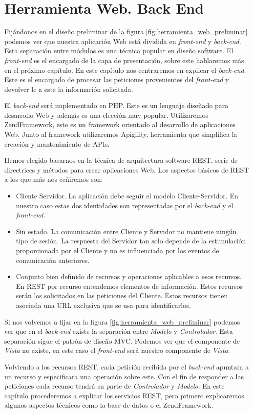 \chapter{Herramienta Web. Back End}
\label{backend}

Fijándonos en el diseño preliminar de la figura \ref{fig:herramienta_web_preliminar} podemos ver que nuestra aplicación Web está dividida en
\emph{front-end} y \emph{back-end}. Esta separación entre módulos es una técnica popular en diseño software. El \emph{front-end} es el encargado de
la capa de presentación, sobre este hablaremos más en el próximo capítulo. En este capítulo nos centraremos en explicar el \emph{back-end}. Este es el
encargado de procesar las peticiones provenientes del \emph{front-end} y devolver le a este la información solicitada. 
\par
El \emph{back-end} será implementado en PHP\cite{PHP}. Este es un lenguaje diseñado para desarrollo Web y además es una elección muy popular. 
Utilizaremos ZendFramework\cite{ZF}, este es un framework orientado al desarrollo de aplicaciones Web. Junto al framework utilizaremos 
Apigility\cite{Apigility}, herramienta que simplifica la creación y mantenimiento de APIs.
\par
Hemos elegido basarnos en la técnica de arquitectura software REST\cite{Rest}, serie de directrices y métodos para crear aplicaciones Web. Los
aspectos básicos de REST a los que más nos ceñiremos son:
\begin{itemize}
	\item	Cliente Servidor. La aplicación debe seguir el modelo Cliente-Servidor. En nuestro caso estas dos identidades son representadas por el
	  	\emph{back-end} y el \emph{front-end}.
	\item	Sin estado. La comunicación entre Cliente y Servidor no mantiene ningún tipo de sesión. La respuesta del Servidor tan solo depende de
	  	la estimulación proporcionada por el Cliente y no es influenciada por los eventos de comunicación anteriores.
	\item	Conjunto bien definido de recursos y operaciones aplicables a esos recursos. En REST por recurso entendemos elementos de información.
	  	Estos recursos serán los solicitados en las peticiones del Cliente. Estos recursos tienen asociada una URL exclusiva que se usa para
		identificarlos.
\end{itemize}
Si nos volvemos a fijar en la figura \ref{fig:herramienta_web_preliminar} podemos ver que en el \emph{back-end} existe la separación entre
\emph{Modelo} y \emph{Controlador}. Esta separación sigue el patrón de diseño MVC\cite{MVCWiki}. Podemos ver que el componente de \emph{Vista} no
existe, en este caso el \emph{front-end} será nuestro componente de \emph{Vista}.
\par
Volviendo a los recursos REST, cada petición recibida por el \emph{back-end} apuntara a un recurso y especificara una operación sobre este. Con el fin
de responder a las peticiones cada recurso tendrá su parte de \emph{Controlador} y \emph{Modelo}. En este capítulo procederemos a explicar los
servicios REST, pero primero explicaremos algunos aspectos técnicos como la base de datos o el ZendFramework.
